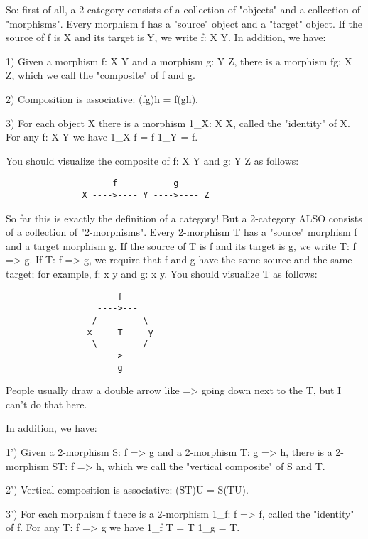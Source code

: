 So: first of all, a 2-category consists of a collection of "objects" and a
collection of "morphisms".  Every morphism f has a "source" object and a
"target" object.  If the source of f is X and its target is Y, we write
f: X \to  Y.  In addition, we have:

1)  Given a morphism f: X \to  Y and a morphism g: Y \to  Z, there
is a morphism fg: X \to  Z, which we call the "composite" of f and g.

2)  Composition is associative:  (fg)h = f(gh).

3)  For each object X there is a morphism 1_{X}: X \to  X, called the
"identity" of X.  For any f: X \to  Y we have 1_{X} f = f 1_{Y} = f.

You should visualize the composite of f: X \to  Y and g: Y \to  Z as
follows:

\begin{verbatim}
                     f           g
               X ---->---- Y ---->---- Z

\end{verbatim}
    
So far this is exactly the definition of a category!  But a 2-category
ALSO consists of a collection of "2-morphisms".  Every 2-morphism T has
a "source" morphism f and a target morphism g.  If the source of T is f
and its target is g, we write T: f => g.  If T: f => g, we require that
f and g have the same source and the same target; for example, f: x \to  y
and g: x \to  y.  You should visualize T as follows:

\begin{verbatim}
                      f
                  ---->---
                 /         \
                x     T     y
                 \         /
                  ---->----
                      g

\end{verbatim}
    
People usually draw a double arrow like => going down next to the T, but
I can't do that here.  

In addition, we have:

1') Given a 2-morphism S: f => g and a 2-morphism T: g => h, there is a
2-morphism ST: f => h, which we call the "vertical composite" of S and
T.

2')  Vertical composition is associative:  (ST)U = S(TU).


3') For each morphism f there is a 2-morphism 1_{f}: f => f,
called the "identity" of f.  For any T: f => g we have
1_{f} T = T 1_{g} = T.

